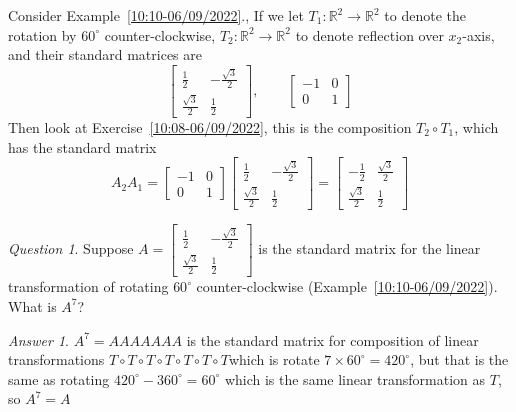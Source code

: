 \documentclass{beamer}
\theoremstyle{definition}
\theoremstyle{remark}
\newtheorem*{question}{Question}
\newtheorem*{answer}{Answer}
\begin{document}
\begin{frame}[t]
\begin{example}
Consider Example~\ref{10:10-06/09/2022}., If we let $T_1:\mathbb R^2\to\mathbb R^2$ to denote the rotation by $60^\circ$ counter-clockwise, $T_2:\mathbb R^2\to\mathbb R^2$ to denote reflection over $x_2$-axis, and their standard matrices are
\[
\begin{bmatrix}
\frac{1}{2}&-\frac{\sqrt{3}}{2}\\\frac{\sqrt{3}}{2}&\frac{1}{2}
\end{bmatrix},\qquad\begin{bmatrix}
-1&0\\0&1
\end{bmatrix}
\]\pause
Then look at Exercise~\ref{10:08-06/09/2022}, this is the composition $T_2\circ T_1$, which has the standard matrix
\[
A_2A_1=\begin{bmatrix}
-1&0\\0&1
\end{bmatrix}\begin{bmatrix}
\frac{1}{2}&-\frac{\sqrt{3}}{2}\\\frac{\sqrt{3}}{2}&\frac{1}{2}
\end{bmatrix}=\begin{bmatrix}
-\frac{1}{2}&\frac{\sqrt{3}}{2}\\
\frac{\sqrt{3}}{2}&\frac{1}{2}
\end{bmatrix}
\]
\end{example}
\end{frame}

\begin{frame}[t]
\begin{question}
Suppose $A=\begin{bmatrix}
\frac{1}{2}&-\frac{\sqrt{3}}{2}\\\frac{\sqrt{3}}{2}&\frac{1}{2}
\end{bmatrix}$ is the standard matrix for the linear transformation of rotating $60^\circ$ counter-clockwise (Example~\ref{10:10-06/09/2022}). What is $A^7$?
\end{question}
\pause
\begin{answer}
$A^7=AAAAAAA$ is the standard matrix for composition of linear transformations $T\circ T\circ T\circ T\circ T\circ T\circ T$\pause which is rotate $7\times60^\circ=420^\circ$\pause, but that is the same as rotating $420^\circ-360^\circ=60^\circ$ which is the same linear transformation as $T$\pause, so $A^7=A$
\begin{center}
\end{center}
\end{answer}
\end{frame}
\end{document}
